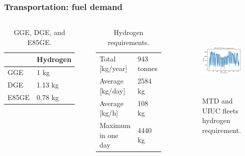 \begin{frame}
\frametitle{Transportation: fuel demand}
\begin{columns}
    \column[t]{5cm}
	\begin{table}[!htb]
		\centering
	    \caption{GGE, DGE, and E85GE.}
		\begin{tabular}{l|l}
		\hline
		                 & Hydrogen \\ \hline
		GGE              & 1 kg     \\
		DGE              & 1.13 kg  \\
		E85GE            & 0.78 kg  \\ \hline
        \end{tabular}
	    \label{tab:h2req1}
	\end{table}

	\begin{table}[!htb]
		\centering
	    \caption{Hydrogen requirements.}
		\begin{tabular}{l|l}
		\hline
		Total [kg/year]      & 943 tonnes \\
		Average [kg/day] 	 & 2584 kg    \\
		Average [kg/h] 		 & 108 kg     \\
		Maximum in one day   & 4440 kg    \\ \hline
        \end{tabular}
	    \label{tab:h2req2}
	\end{table}

	\column[t]{5cm}
	\begin{figure}[htbp!]
		\begin{center}
			\includegraphics[height=3.5cm]{images/hydro-fleet}
		\end{center}
		\caption{MTD and UIUC fleets hydrogen requirement.}
	\end{figure}

\end{columns}
\end{frame}



